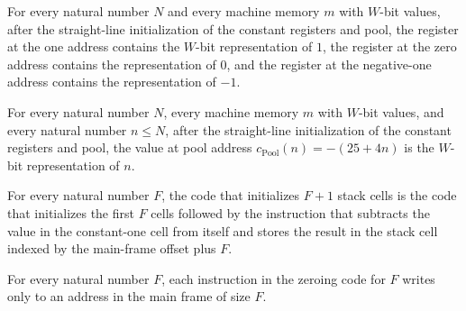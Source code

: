 \begin{theorem}
\label{Light.Compiler.poolMem_consts}
\leanok
{}
For every natural number $N$ and every machine memory $m$ with $W$-bit values, after the
straight-line initialization of the constant registers and pool, the register at the one
address contains the $W$-bit representation of $1$, the register at the zero address
contains the representation of $0$, and the register at the negative-one address
contains the representation of $-1$.
\end{theorem}

\begin{theorem}
\label{Light.Compiler.poolMem_pool}
\leanok
{}
For every natural number $N$, every machine memory $m$ with $W$-bit values, and every
natural number $n\le N$, after the straight-line initialization of the constant
registers and pool, the value at pool address $c_{\mathrm{Pool}}(n)=-(25+4n)$ is the
$W$-bit representation of $n$.
\end{theorem}

\begin{theorem}
\label{Light.Compiler.zeroCode_succ}
\leanok
{}
For every natural number $F$, the code that initializes $F+1$ stack cells is the code
that initializes the first $F$ cells followed by the instruction that subtracts the
value in the constant-one cell from itself and stores the result in the stack cell
indexed by the main-frame offset plus $F$.
\end{theorem}

\begin{theorem}
\label{Light.Compiler.writesIn_zeroCode}
\leanok
{}
For every natural number $F$, each instruction in the zeroing code for $F$ writes only
to an address in the main frame of size $F$.
\end{theorem}

